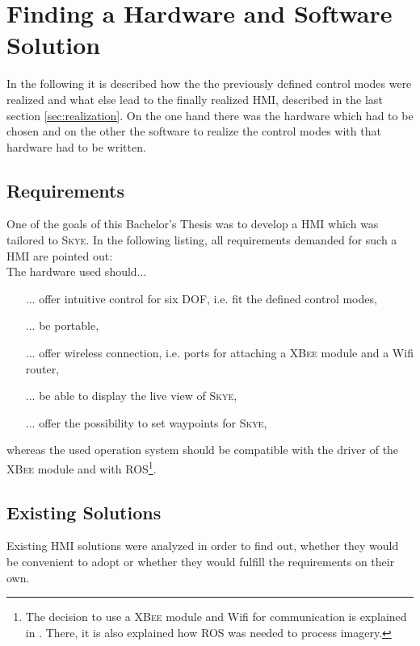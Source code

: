 \graphicspath{{graphics/HMI/}{graphics/control_modes/}}
\chapter{Finding a Hardware and Software Solution}
\label{cha:findHardSoftSolution}
In the following it is described how the the previously defined control modes were realized and what else lead to the finally realized HMI, described in the last section \ref{sec:realization}. On the one hand there was the hardware which had to be chosen and on the other the software to realize the control modes with that hardware had to be written.



\section{Requirements}
\label{sec:requirements}
One of the goals of this Bachelor's Thesis was to develop a HMI which was tailored to \textsc{Skye}. In the following listing, all requirements demanded for such a HMI are pointed out: \\

The hardware used should...
\begin{itemize}
\item[...]{offer intuitive control for six DOF, i.e. fit the defined control modes, }
\item[...]{be portable,}
\item[...]{offer wireless connection, i.e. ports for attaching a \textsc{XBee} module and a Wifi router,}
\item[...]{be able to display the live view of \textsc{Skye},}
\item[...]{offer the possibility to set waypoints for \textsc{Skye},}
\end{itemize}
whereas the used operation system should be compatible with the driver of the \textsc{XBee} module and with ROS\footnote{The decision to use a \textsc{XBee} module and Wifi for communication is explained in \cite{burri}. There, it is also explained how \textsc{ROS} was needed to process imagery.}.


\section{Existing Solutions}
\label{sec:existingSolutions}
Existing HMI solutions were analyzed in order to find out, whether they would be convenient to adopt or whether they would fulfill the requirements on their own. 


